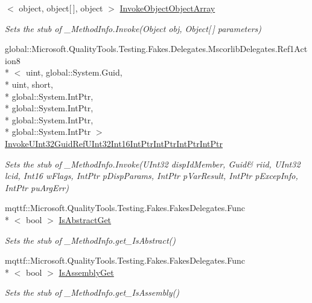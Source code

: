\begin{DoxyCompactItemize}
$<$ object, object\mbox{[}$\,$\mbox{]}, object $>$ \hyperlink{class_system_1_1_runtime_1_1_interop_services_1_1_fakes_1_1_stub___method_info_a285b7da66ba81942445d1b8e457f6595}{Invoke\-Object\-Object\-Array}
\begin{DoxyCompactList}\small\item\em Sets the stub of \-\_\-\-Method\-Info.\-Invoke(\-Object obj, Object\mbox{[}$\,$\mbox{]} parameters)\end{DoxyCompactList}\item 
global\-::\-Microsoft.\-Quality\-Tools.\-Testing.\-Fakes.\-Delegates.\-Mscorlib\-Delegates.\-Ref1\-Action8\\*
$<$ uint, global\-::\-System.\-Guid, \\*
uint, short, \\*
global\-::\-System.\-Int\-Ptr, \\*
global\-::\-System.\-Int\-Ptr, \\*
global\-::\-System.\-Int\-Ptr, \\*
global\-::\-System.\-Int\-Ptr $>$ \hyperlink{class_system_1_1_runtime_1_1_interop_services_1_1_fakes_1_1_stub___method_info_a595a92b616313e350c13ff1cf8b9510f}{Invoke\-U\-Int32\-Guid\-Ref\-U\-Int32\-Int16\-Int\-Ptr\-Int\-Ptr\-Int\-Ptr\-Int\-Ptr}
\begin{DoxyCompactList}\small\item\em Sets the stub of \-\_\-\-Method\-Info.\-Invoke(U\-Int32 disp\-Id\-Member, Guid\& riid, U\-Int32 lcid, Int16 w\-Flags, Int\-Ptr p\-Disp\-Params, Int\-Ptr p\-Var\-Result, Int\-Ptr p\-Excep\-Info, Int\-Ptr pu\-Arg\-Err)\end{DoxyCompactList}\item 
mqttf\-::\-Microsoft.\-Quality\-Tools.\-Testing.\-Fakes.\-Fakes\-Delegates.\-Func\\*
$<$ bool $>$ \hyperlink{class_system_1_1_runtime_1_1_interop_services_1_1_fakes_1_1_stub___method_info_a8aebd2a6673357ad080d90922b4ad984}{Is\-Abstract\-Get}
\begin{DoxyCompactList}\small\item\em Sets the stub of \-\_\-\-Method\-Info.\-get\-\_\-\-Is\-Abstract()\end{DoxyCompactList}\item 
mqttf\-::\-Microsoft.\-Quality\-Tools.\-Testing.\-Fakes.\-Fakes\-Delegates.\-Func\\*
$<$ bool $>$ \hyperlink{class_system_1_1_runtime_1_1_interop_services_1_1_fakes_1_1_stub___method_info_ab46a1b075ead791f7fff9c3fb179fcf6}{Is\-Assembly\-Get}
\begin{DoxyCompactList}\small\item\em Sets the stub of \-\_\-\-Method\-Info.\-get\-\_\-\-Is\-Assembly()\end{DoxyCompactList}\item 

\end{DoxyCompactItemize}

